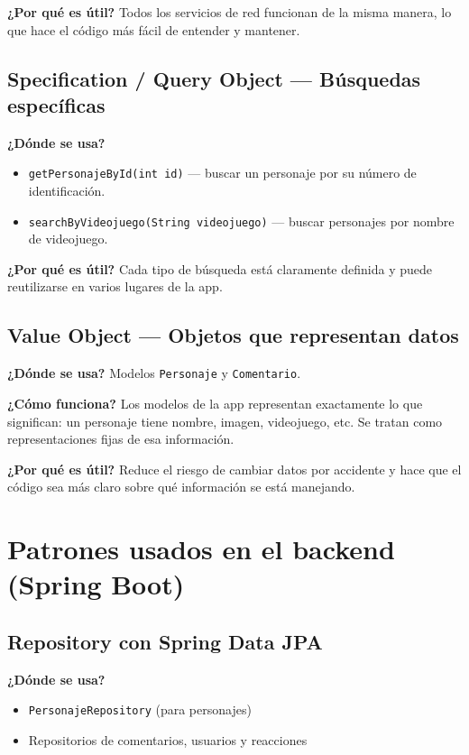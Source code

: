 \documentclass[12pt,a4paper]{article}
\begin{document}
\textbf{¿Por qué es útil?} Todos los servicios de red funcionan de la misma manera, lo que hace el código más fácil de entender y mantener.

\subsection{Specification / Query Object — Búsquedas específicas}
\textbf{¿Dónde se usa?}
\begin{itemize}[leftmargin=1.2cm]
  \item \texttt{getPersonajeById(int id)} — buscar un personaje por su número de identificación.
  \item \texttt{searchByVideojuego(String videojuego)} — buscar personajes por nombre de videojuego.
\end{itemize}

\textbf{¿Por qué es útil?} Cada tipo de búsqueda está claramente definida y puede reutilizarse en varios lugares de la app.

\subsection{Value Object — Objetos que representan datos}
\textbf{¿Dónde se usa?} Modelos \texttt{Personaje} y \texttt{Comentario}.

\textbf{¿Cómo funciona?} Los modelos de la app representan exactamente lo que significan: un personaje tiene nombre, imagen, videojuego, etc. Se tratan como representaciones fijas de esa información.

\textbf{¿Por qué es útil?} Reduce el riesgo de cambiar datos por accidente y hace que el código sea más claro sobre qué información se está manejando.



\section{Patrones usados en el backend (Spring Boot)}

\subsection{Repository con Spring Data JPA}
\textbf{¿Dónde se usa?}
\begin{itemize}[leftmargin=1.2cm]
  \item \texttt{PersonajeRepository} (para personajes)
  \item Repositorios de comentarios, usuarios y reacciones
\end{itemize}
\end{document}

